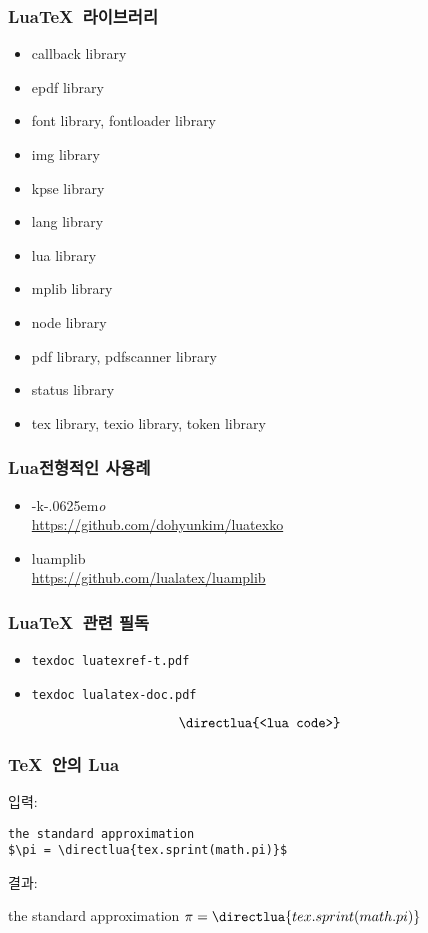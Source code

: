 \documentclass{beamer}
\def\luatex{\hologo{LuaTeX}}
\def\logoko{\textsf{k}\kern-.0625em\textit{o}}
\def\luatexko{\luatex-\logoko}
\begin{document}
\begin{frame}
  \frametitle{Lua\TeX\ 라이브러리}
  \vspace{-3mm}
  \begin{itemize}
  \item callback library
  \item epdf library
  \item font library, fontloader library
  \item img library
  \item kpse library
  \item lang library
  \item lua library
  \item mplib library
  \item node library
  \item pdf library, pdfscanner library
  \item status library
  \item tex library, texio library, token library
  \end{itemize}
\end{frame}

\begin{frame}
  \frametitle{Lua 전형적인 사용례}
  \begin{itemize}
  \item \luatexko\\ \url{https://github.com/dohyunkim/luatexko}
  \item luamplib\\ \url{https://github.com/lualatex/luamplib}
  \end{itemize}
\end{frame}

\begin{frame}[fragile]
  \frametitle{Lua\TeX\ 관련 필독}
  \begin{itemize}
  \item \texttt{texdoc luatexref-t.pdf}
  \item \texttt{texdoc lualatex-doc.pdf}
  \end{itemize}
\end{frame}

\begin{frame}[fragile]
  \[\texttt{\string\directlua\{<lua code>\}}\]
  \frametitle{\TeX\ 안의 Lua}
  입력:
\begin{verbatim}
the standard approximation 
$\pi = \directlua{tex.sprint(math.pi)}$
\end{verbatim}
결과:
\begin{center}
  the standard approximation $\pi = \directlua{tex.sprint(math.pi)}$
\end{center}
\end{frame}
\end{document}

